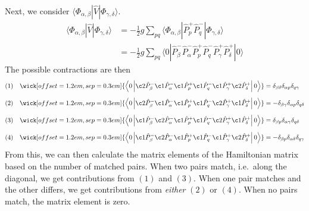 Next, we consider $\langle \Phi_{\alpha, \beta} | \hat{V} | \Phi_{\gamma, \delta} \rangle$.
\begin{align*}
    \langle \Phi_{\alpha, \beta} | \hat{V} | \Phi_{\gamma, \delta} \rangle
    &= -\frac{1}{2} g \sum_{pq} \langle \Phi_{\alpha, \beta} | \hat{P}_p^+ \hat{P}_q^- | \Phi_{\gamma, \delta} \rangle \\
    &= -\frac{1}{2} g \sum_{pq} \langle 0 | \hat{P}_\beta^- \hat{P}_\alpha^- \hat{P}_p^+ \hat{P}_q^- \hat{P}_\gamma^+ \hat{P}_\delta^+| 0 \rangle
\end{align*}
The possible contractions are then
\begin{align*}
    (1) \quad \wick[offset=1.2em,sep=0.3em]{
        \left\langle 0 \left\vert
        \c2 {\hat{P}_\beta^-}
        \c1 {\hat{P}_\alpha^-}
        \c1 {\hat{P}_p^+}
        \c1 {\hat{P}_q^-}
        \c1 {\hat{P}_\gamma^+}
        \c2 {\hat{P}_\delta^+}
        \right\vert 0 \right\rangle
    } &= \delta_{\beta \delta} \delta_{\alpha p} \delta_{q \gamma} \\[0.5em]
    (2) \quad \wick[offset=1.2em,sep=0.3em]{
        \left\langle 0 \left\vert
        \c2 {\hat{P}_\beta^-}
        \c1 {\hat{P}_\alpha^-}
        \c1 {\hat{P}_p^+}
        \c1 {\hat{P}_q^-}
        \c2 {\hat{P}_\gamma^+}
        \c1 {\hat{P}_\delta^+}
        \right\vert 0 \right\rangle
    } &= -\delta_{\beta \gamma} \delta_{\alpha p} \delta_{q \delta} \\[0.5em]
    (3) \quad \wick[offset=1.2em,sep=0.3em]{
        \left\langle 0 \left\vert
        \c1 {\hat{P}_\beta^-}
        \c2 {\hat{P}_\alpha^-}
        \c1 {\hat{P}_p^+}
        \c1 {\hat{P}_q^-}
        \c2 {\hat{P}_\gamma^+}
        \c1 {\hat{P}_\delta^+}
        \right\vert 0 \right\rangle
    } &= \delta_{\beta p} \delta_{\alpha \gamma} \delta_{q \delta} \\[0.5em]
    (4) \quad \wick[offset=1.2em,sep=0.3em]{
        \left\langle 0 \left\vert
        \c1 {\hat{P}_\beta^-}
        \c2 {\hat{P}_\alpha^-}
        \c1 {\hat{P}_p^+}
        \c1 {\hat{P}_q^-}
        \c1 {\hat{P}_\gamma^+}
        \c2 {\hat{P}_\delta^+}
        \right\vert 0 \right\rangle
    } &= -\delta_{\beta p} \delta_{\alpha \delta} \delta_{q \gamma}
\end{align*}
From this, we can then calculate the matrix elements of the Hamiltonian matrix based on the number of matched pairs.
When two pairs match, i.e.~along the diagonal, we get contributions from $(1)$ and $(3)$.
When one pair matches and the other differs, we get contributions from \textit{either} $(2)$ or $(4)$.
When no pairs match, the matrix element is zero.


